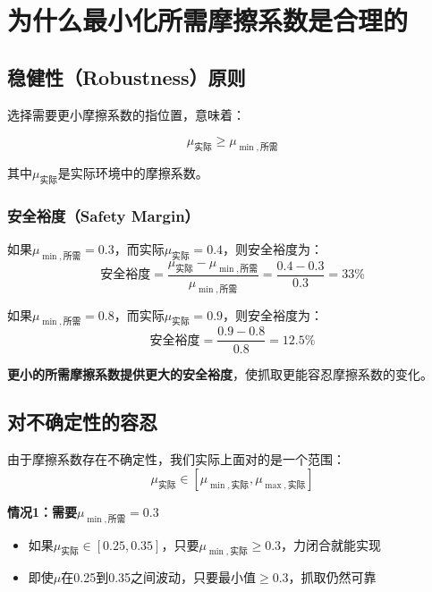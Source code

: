 \documentclass[12pt,a4paper]{article}
\begin{document}
\section{为什么最小化所需摩擦系数是合理的}

\subsection{稳健性（Robustness）原则}

选择需要更小摩擦系数的指位置，意味着：

\begin{equation}
\mu_{\text{实际}} \geq \mu_{\min,\text{所需}}
\end{equation}

其中$\mu_{\text{实际}}$是实际环境中的摩擦系数。

\subsubsection{安全裕度（Safety Margin）}

如果$\mu_{\min,\text{所需}} = 0.3$，而实际$\mu_{\text{实际}} = 0.4$，则安全裕度为：
\begin{equation}
\text{安全裕度} = \frac{\mu_{\text{实际}} - \mu_{\min,\text{所需}}}{\mu_{\min,\text{所需}}} = \frac{0.4 - 0.3}{0.3} = 33\%
\end{equation}

如果$\mu_{\min,\text{所需}} = 0.8$，而实际$\mu_{\text{实际}} = 0.9$，则安全裕度为：
\begin{equation}
\text{安全裕度} = \frac{0.9 - 0.8}{0.8} = 12.5\%
\end{equation}

\textbf{更小的所需摩擦系数提供更大的安全裕度}，使抓取更能容忍摩擦系数的变化。

\subsection{对不确定性的容忍}

由于摩擦系数存在不确定性，我们实际上面对的是一个范围：
\begin{equation}
\mu_{\text{实际}} \in [\mu_{\min,\text{实际}}, \mu_{\max,\text{实际}}]
\end{equation}

\textbf{情况1：需要$\mu_{\min,\text{所需}} = 0.3$}
\begin{itemize}
    \item 如果$\mu_{\text{实际}} \in [0.25, 0.35]$，只要$\mu_{\min,\text{实际}} \geq 0.3$，力闭合就能实现
    \item 即使$\mu$在0.25到0.35之间波动，只要最小值$\geq 0.3$，抓取仍然可靠
\end{itemize}
\end{document}
